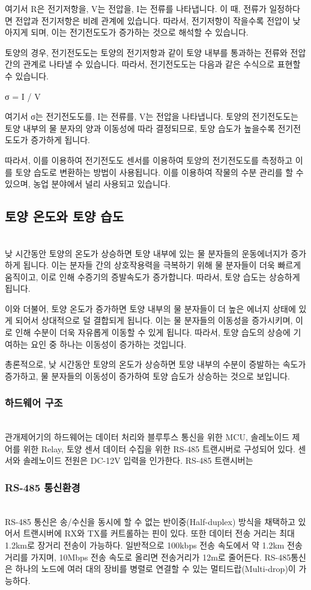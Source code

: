 \documentclass[11pt]{article}
\begin{document}
여기서 R은 전기저항을, V는 전압을, I는 전류를 나타냅니다. 이 때, 전류가 일정하다면 전압과 전기저항은 비례 관계에 있습니다. 따라서, 전기저항이 작을수록 전압이 낮아지게 되며, 이는 전기전도도가 증가하는 것으로 해석할 수 있습니다.

토양의 경우, 전기전도도는 토양의 전기저항과 같이 토양 내부를 통과하는 전류와 전압 간의 관계로 나타낼 수 있습니다. 따라서, 전기전도도는 다음과 같은 수식으로 표현할 수 있습니다.

σ = I / V

여기서 σ는 전기전도도를, I는 전류를, V는 전압을 나타냅니다. 토양의 전기전도도는 토양 내부의 물 분자의 양과 이동성에 따라 결정되므로, 토양 습도가 높을수록 전기전도도가 증가하게 됩니다.

따라서, 이를 이용하여 전기전도도 센서를 이용하여 토양의 전기전도도를 측정하고 이를 토양 습도로 변환하는 방법이 사용됩니다. 이를 이용하여 작물의 수분 관리를 할 수 있으며, 농업 분야에서 널리 사용되고 있습니다.
\subsection{토양 온도와 토양 습도}
\indent \\낮 시간동안 토양의 온도가 상승하면 토양 내부에 있는 물 분자들의 운동에너지가 증가하게 됩니다. 이는 분자들 간의 상호작용력을 극복하기 위해 물 분자들이 더욱 빠르게 움직이고, 이로 인해 수증기의 증발속도가 증가합니다. 따라서, 토양 습도는 상승하게 됩니다.

이와 더불어, 토양 온도가 증가하면 토양 내부의 물 분자들이 더 높은 에너지 상태에 있게 되어서 상대적으로 덜 결합되게 됩니다. 이는 물 분자들의 이동성을 증가시키며, 이로 인해 수분이 더욱 자유롭게 이동할 수 있게 됩니다. 따라서, 토양 습도의 상승에 기여하는 요인 중 하나는 이동성이 증가하는 것입니다.

총론적으로, 낮 시간동안 토양의 온도가 상승하면 토양 내부의 수분이 증발하는 속도가 증가하고, 물 분자들의 이동성이 증가하여 토양 습도가 상승하는 것으로 보입니다.

\subsubsection{하드웨어 구조}
\indent \\관개제어기의 하드웨어는 데이터 처리와 블루투스 통신을 위한 MCU, 솔레노이드 제어를 위한 Relay, 토양 센서 데이터 수집을 위한 RS-485 트랜시버로 구성되어 있다. 센서와 솔레노이드 전원은 DC-12V 입력을 인가한다. RS-485 트랜시버는 

\subsubsection{RS-485 통신환경}
\indent \\RS-485 통신은 송/수신을 동시에 할 수 없는 반이중(Half-duplex) 방식을 채택하고 있어서 트랜시버에 RX와 TX를 커트롤하는 핀이 있다. 또한 데이터 전송 거리는 최대 1.2km로 장거리 전송이 가능하다. 일반적으로 100kbps 전송 속도에서 약 1.2km 전송거리를 가지며, 10Mbps 전송 속도로 올리면 전송거리가 12m로 줄어든다. RS-485통신은 하나의 노드에 여러 대의 장비를 병렬로 연결할 수 있는 멀티드랍(Multi-drop)이 가능하다.
\end{document}
